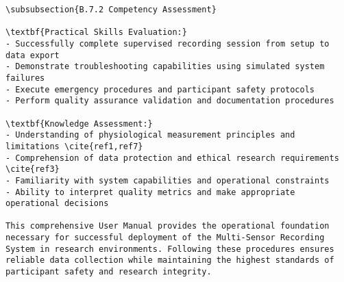 \begin{verbatim}
\subsubsection{B.7.2 Competency Assessment}

\textbf{Practical Skills Evaluation:}
- Successfully complete supervised recording session from setup to data export
- Demonstrate troubleshooting capabilities using simulated system failures
- Execute emergency procedures and participant safety protocols
- Perform quality assurance validation and documentation procedures

\textbf{Knowledge Assessment:}
- Understanding of physiological measurement principles and limitations \cite{ref1,ref7}
- Comprehension of data protection and ethical research requirements \cite{ref3}
- Familiarity with system capabilities and operational constraints
- Ability to interpret quality metrics and make appropriate operational decisions

This comprehensive User Manual provides the operational foundation necessary for successful deployment of the Multi-Sensor Recording System in research environments. Following these procedures ensures reliable data collection while maintaining the highest standards of participant safety and research integrity.
\end{verbatim}
